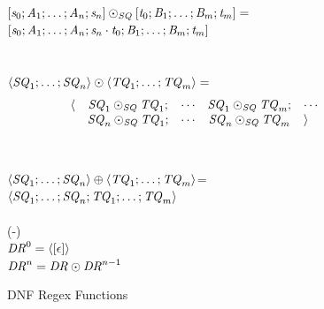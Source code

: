 \documentclass[numbers]{sigplanconf}
\begin{document}
\begin{figure}
  \ConcatSequence{} \OfType{} \ArrowTypeOf{\SequenceType{}}{\ArrowTypeOf{\SequenceType{}}{\SequenceType{}}}\\
  $[\mathit{s}_0;\mathit{A}_1;\ldots;\mathit{A}_n;\mathit{s}_n]\odot_{\mathit{SQ}}[\mathit{t}_0;\mathit{B}_1;\ldots;\mathit{B}_m;\mathit{t}_m]=$\\
  \hspace*{2ex}$[\mathit{s}_0;\mathit{A}_1;\ldots;\mathit{A}_n;\mathit{s}_n\cdot\mathit{t}_0;\mathit{B}_1;\ldots;\mathit{B}_m;\mathit{t}_m]$\\
  \\
  \ConcatDNF{} \OfType{} \ArrowTypeOf{\DNFRegexType{}}{\ArrowTypeOf{\DNFRegexType{}}{\DNFRegexType{}}}\\
  $\langle\mathit{SQ}_1;\ldots;\mathit{SQ}_n\rangle\odot\langle\mathit{TQ}_1;\ldots;\mathit{TQ}_m\rangle=$
  \[
    \begin{array}{rcccl}
      \langle & \mathit{SQ}_1\odot_{\mathit{SQ}}\mathit{TQ}_1; & \cdots
      & \mathit{SQ}_1\odot_{\mathit{SQ}}\mathit{TQ}_m; & \cdots \\
               & \mathit{SQ}_n\odot_{\mathit{SQ}}\mathit{TQ}_1; & \cdots & \mathit{SQ}_n\odot_{\mathit{SQ}}\mathit{TQ}_m & \rangle
    \end{array}
  \]
  \\
  \OrDNF{} \OfType{}
  \ArrowTypeOf{\DNFRegexType{}}{\ArrowTypeOf{\DNFRegexType{}}{\DNFRegexType{}}
  }\\
  $\langle\mathit{SQ}_1;\ldots;\mathit{SQ}_n\rangle\oplus\langle\mathit{TQ}_1;\ldots;\mathit{TQ}_m\rangle$=\\
  \hspace*{2ex}$\langle\mathit{SQ}_1;\ldots;\mathit{SQ}_n;\mathit{TQ}_1;\ldots;\mathit{TQ}_m\rangle$\\
  \\
  (-) \OfType{} \ArrowTypeOf{\DNFRegexType{}}{\DNFRegexType{}}\\
  $\mathit{DR}^{0}=\langle[\epsilon]\rangle$\\
  $\mathit{DR}^{n}=\mathit{DR}\odot\mathit{DR}^{n-1}$\\
  \caption{DNF Regex Functions} 
  \label{fig:dnf-regex-functions}
\end{figure}
\end{document}
